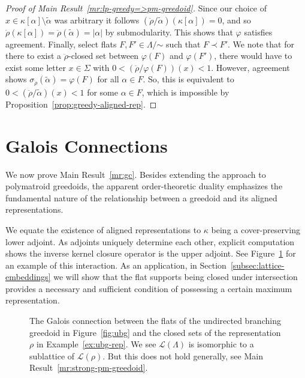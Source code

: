 \documentclass[11pt]{article}
\newcommand{\univ}{\Sigma}
\newcommand{\glang}{\Lambda}
\newcommand{\greedyrep}{\ddot{\rho}}
\providecommand{\L}{}
\renewcommand{\L}{\mathscr{L}}
\begin{document}
\begin{proof}[Proof of Main Result~\ref{mr:lp-greedy=>pm-greedoid}]
    Since our choice of $x \in \kappa[\alpha]\setminus\widetilde{\alpha}$ was arbitrary it follows $(\greedyrep/\widetilde{\alpha})(\kappa[\alpha]) = 0$, and so $\greedyrep(\kappa[\alpha]) = \greedyrep(\widetilde{\alpha}) = |\alpha|$ by submodularity.
    This shows that $\varphi$ satisfies agreement.
    Finally, select flats $F,F'\in\glang/\mathord{\sim}$ such that $F\prec F'$.
    We note that for there to exist a $\greedyrep$-closed set between $\varphi(F)$ and $\varphi(F')$, there would have to exist some letter $x \in \univ$ with $0 < (\greedyrep/\varphi(F))(x) < 1$.
    However, agreement shows $\sigma_{\greedyrep}(\widetilde{\alpha}) = \varphi(F)$ for all $\alpha \in F$.
    So, this is equivalent to $0 < (\greedyrep/\widetilde{\alpha})(x) < 1$ for some $\alpha \in F$, which is impossible by Proposition~\ref{prop:greedy-aligned-rep}.
\end{proof}

\section{Galois Connections}\label{sec:galois}
We now prove Main Result~\ref{mr:gc}.
Besides extending the approach to polymatroid greedoids, the apparent order-theoretic duality emphasizes the fundamental nature of the relationship between a greedoid and its aligned representations.

We equate the existence of aligned representations to $\kappa$ being a cover-preserving lower adjoint.
As adjoints uniquely determine each other, explicit computation shows the inverse kernel closure operator is the upper adjoint.
See Figure~\ref{fig:galois} for an example of this interaction.
As an application, in Section~\ref{subsec:lattice-embeddings} we will show that the flat supports being closed under intersection provides a necessary and sufficient condition of possessing a certain maximum representation.

\begin{figure}[t!]
    \centering
    \scalebox{.8}{
    
    }
    \caption{The Galois connection between the flats of the undirected branching greedoid in Figure~\ref{fig:ubg} and the closed sets of the representation $\rho$ in Example~\ref{ex:ubg-rep}. 
        We see $\L(\glang)$ is isomorphic to a sublattice of $\L(\rho)$.
        But this does not hold generally, see Main Result~\ref{mr:strong-pm-greedoid}.
    }\label{fig:galois}
\end{figure}
\end{document}

